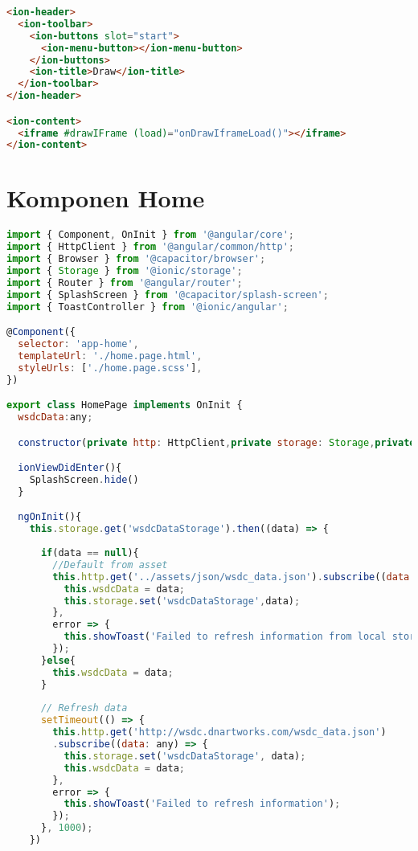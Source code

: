 \begin{lstlisting}[language=html, label={lst:draw.page.html}, caption=draw.page.html]
<ion-header>
  <ion-toolbar>
    <ion-buttons slot="start">
      <ion-menu-button></ion-menu-button>
    </ion-buttons>
    <ion-title>Draw</ion-title>
  </ion-toolbar>
</ion-header>

<ion-content>
  <iframe #drawIFrame (load)="onDrawIframeLoad()"></iframe>
</ion-content>
\end{lstlisting} 

\newpage

\section{Komponen Home} 
\label{sec:lampiranKomponenHome}

\begin{lstlisting}[language=JavaScript, label={lst:home.page.ts}, caption=home.page.ts]
import { Component, OnInit } from '@angular/core';
import { HttpClient } from '@angular/common/http';
import { Browser } from '@capacitor/browser';
import { Storage } from '@ionic/storage';
import { Router } from '@angular/router';
import { SplashScreen } from '@capacitor/splash-screen';
import { ToastController } from '@ionic/angular';

@Component({
  selector: 'app-home',
  templateUrl: './home.page.html',
  styleUrls: ['./home.page.scss'],
})

export class HomePage implements OnInit {
  wsdcData:any;

  constructor(private http: HttpClient,private storage: Storage,private router: Router,public toastController: ToastController) { }

  ionViewDidEnter(){ 
    SplashScreen.hide()
  }

  ngOnInit(){ 
    this.storage.get('wsdcDataStorage').then((data) => {
      
      if(data == null){
        //Default from asset
        this.http.get('../assets/json/wsdc_data.json').subscribe((data: any) => {
          this.wsdcData = data;
          this.storage.set('wsdcDataStorage',data);       
        },
        error => {
          this.showToast('Failed to refresh information from local storage');
        });
      }else{    
        this.wsdcData = data;
      }
      
      // Refresh data
      setTimeout(() => {
        this.http.get('http://wsdc.dnartworks.com/wsdc_data.json')
        .subscribe((data: any) => {
          this.storage.set('wsdcDataStorage', data);
          this.wsdcData = data;
        },
        error => {
          this.showToast('Failed to refresh information');
        });
      }, 1000);
    })
    

\end{lstlisting}
